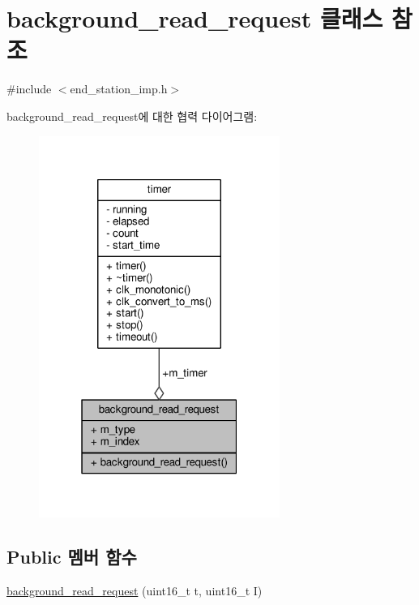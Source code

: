 \hypertarget{classavdecc__lib_1_1background__read__request}{}\section{background\+\_\+read\+\_\+request 클래스 참조}
\label{classavdecc__lib_1_1background__read__request}


{\ttfamily \#include $<$end\+\_\+station\+\_\+imp.\+h$>$}



background\+\_\+read\+\_\+request에 대한 협력 다이어그램\+:
\nopagebreak
\begin{figure}[H]
\begin{center}
\leavevmode
\includegraphics[width=223pt]{classavdecc__lib_1_1background__read__request__coll__graph}
\end{center}
\end{figure}
\subsection*{Public 멤버 함수}
\begin{DoxyCompactItemize}
\item 
\hyperlink{classavdecc__lib_1_1background__read__request_aff220b6f1af772584cb48b455eea3435}{background\+\_\+read\+\_\+request} (uint16\+\_\+t t, uint16\+\_\+t I)
\end{DoxyCompactItemize}
